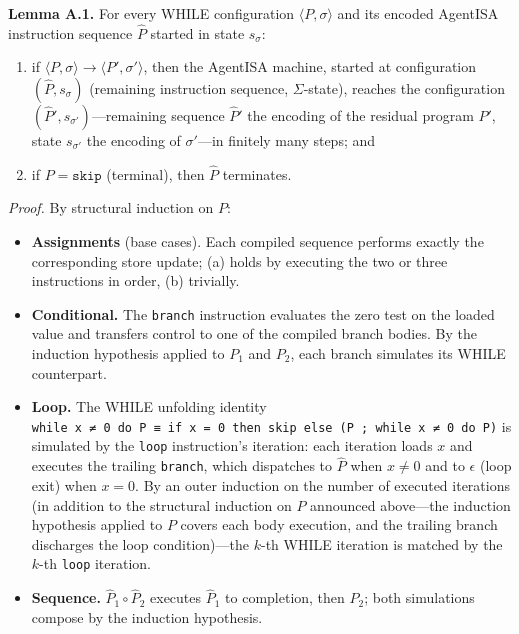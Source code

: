 \documentclass[
  11pt,
]{article}
\begin{document}
\textbf{Lemma A.1.} For every WHILE configuration
\(\langle P, \sigma \rangle\) and its encoded AgentISA instruction
sequence \(\hat{P}\) started in state \(s_\sigma\):

\begin{enumerate}
\def\labelenumi{(\alph{enumi})}
\item
  if \(\langle P, \sigma \rangle \to \langle P', \sigma' \rangle\), then
  the AgentISA machine, started at configuration \((\hat{P}, s_\sigma)\)
  (remaining instruction sequence, \(\Sigma\)-state), reaches the
  configuration \((\hat{P}', s_{\sigma'})\)---remaining sequence
  \(\hat{P}'\) the encoding of the residual program \(P'\), state
  \(s_{\sigma'}\) the encoding of \(\sigma'\)---in finitely many steps;
  and
\item
  if \(P = \texttt{skip}\) (terminal), then \(\hat{P}\) terminates.
\end{enumerate}

\emph{Proof.} By structural induction on \(P\):

\begin{itemize}
\item
  \textbf{Assignments} (base cases). Each compiled sequence performs
  exactly the corresponding store update; (a) holds by executing the two
  or three instructions in order, (b) trivially.
\item
  \textbf{Conditional.} The \texttt{branch} instruction evaluates the
  zero test on the loaded value and transfers control to one of the
  compiled branch bodies. By the induction hypothesis applied to \(P_1\)
  and \(P_2\), each branch simulates its WHILE counterpart.
\item
  \textbf{Loop.} The WHILE unfolding identity
  \texttt{while\ x\ ≠\ 0\ do\ P\ ≡\ if\ x\ =\ 0\ then\ skip\ else\ (P\ ;\ while\ x\ ≠\ 0\ do\ P)}
  is simulated by the \texttt{loop} instruction's iteration: each
  iteration loads \(x\) and executes the trailing \texttt{branch}, which
  dispatches to \(\hat{P}\) when \(x \neq 0\) and to \(\epsilon\) (loop
  exit) when \(x = 0\). By an outer induction on the number of executed
  iterations (in addition to the structural induction on \(P\) announced
  above---the induction hypothesis applied to \(P\) covers each body
  execution, and the trailing branch discharges the loop
  condition)---the \(k\)-th WHILE iteration is matched by the \(k\)-th
  \texttt{loop} iteration.
\item
  \textbf{Sequence.} \(\hat{P}_1 \circ \hat{P}_2\) executes
  \(\hat{P}_1\) to completion, then \(\hat{P}_2\); both simulations
  compose by the induction hypothesis.
\end{itemize}
\end{document}
